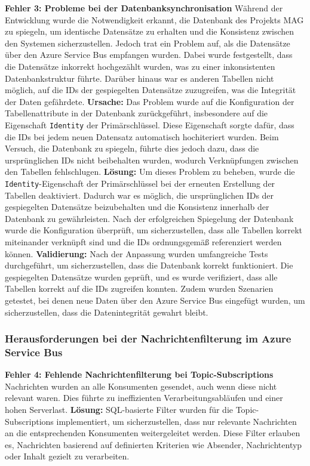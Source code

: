 \textbf{Fehler 3: Probleme bei der Datenbanksynchronisation}  
Während der Entwicklung wurde die Notwendigkeit erkannt, die Datenbank des Projekts MAG zu spiegeln, um identische Datensätze zu erhalten und die Konsistenz zwischen den Systemen sicherzustellen. Jedoch trat ein Problem auf, als die Datensätze über den Azure Service Bus empfangen wurden. Dabei wurde festgestellt, dass die Datensätze inkorrekt hochgezählt wurden, was zu einer inkonsistenten Datenbankstruktur führte. Darüber hinaus war es anderen Tabellen nicht möglich, auf die IDs der gespiegelten Datensätze zuzugreifen, was die Integrität der Daten gefährdete.  
\textbf{Ursache:} Das Problem wurde auf die Konfiguration der Tabellenattribute in der Datenbank zurückgeführt, insbesondere auf die Eigenschaft \texttt{Identity} der Primärschlüssel. Diese Eigenschaft sorgte dafür, dass die IDs bei jedem neuen Datensatz automatisch hochiteriert wurden. Beim Versuch, die Datenbank zu spiegeln, führte dies jedoch dazu, dass die ursprünglichen IDs nicht beibehalten wurden, wodurch Verknüpfungen zwischen den Tabellen fehlschlugen.  
\textbf{Lösung:} Um dieses Problem zu beheben, wurde die \texttt{Identity}-Eigenschaft der Primärschlüssel bei der erneuten Erstellung der Tabellen deaktiviert. Dadurch war es möglich, die ursprünglichen IDs der gespiegelten Datensätze beizubehalten und die Konsistenz innerhalb der Datenbank zu gewährleisten. Nach der erfolgreichen Spiegelung der Datenbank wurde die Konfiguration überprüft, um sicherzustellen, dass alle Tabellen korrekt miteinander verknüpft sind und die IDs ordnungsgemäß referenziert werden können.  
\textbf{Validierung:} Nach der Anpassung wurden umfangreiche Tests durchgeführt, um sicherzustellen, dass die Datenbank korrekt funktioniert. Die gespiegelten Datensätze wurden geprüft, und es wurde verifiziert, dass alle Tabellen korrekt auf die IDs zugreifen konnten. Zudem wurden Szenarien getestet, bei denen neue Daten über den Azure Service Bus eingefügt wurden, um sicherzustellen, dass die Datenintegrität gewahrt bleibt.

\subsubsection*{Herausforderungen bei der Nachrichtenfilterung im Azure Service Bus}

\textbf{Fehler 4: Fehlende Nachrichtenfilterung bei Topic-Subscriptions}  
Nachrichten wurden an alle Konsumenten gesendet, auch wenn diese nicht relevant waren. Dies führte zu ineffizienten Verarbeitungsabläufen und einer hohen Serverlast.  
\textbf{Lösung:} SQL-basierte Filter wurden für die Topic-Subscriptions implementiert, um sicherzustellen, dass nur relevante Nachrichten an die entsprechenden Konsumenten weitergeleitet werden. Diese Filter erlauben es, Nachrichten basierend auf definierten Kriterien wie Absender, Nachrichtentyp oder Inhalt gezielt zu verarbeiten. 
